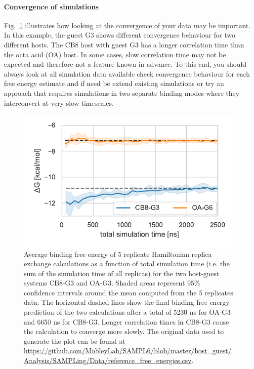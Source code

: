 \documentclass[9pt,bestpractices]{livecoms}
\begin{document}
\paragraph{Convergence of simulations}
Fig.~\ref{fig:freeenergytrajectories} illustrates how looking at the convergence of your data may be important. In this example, the guest G3 shows different convergence behaviour for two different hosts. The CB8 host with guest G3 has a longer correlation time than the octa acid (OA) host. In some cases, slow correlation time may not be expected and therefore not a feature known in advance. To this end, you should always look at all simulation data available check convergence behaviour for each free energy estimate and if need be extend existing simulations or try an approach that requires simulations in two separate binding modes where they interconvert at very slow timescales.   
\begin{figure}
    \includegraphics[width=0.90\linewidth]{figures/fig9_convergence/Figure.pdf}
    \caption{Average binding free energy of 5 replicate Hamiltonian replica exchange calculations as a function of total simulation time (i.e. the sum of the simulation time of all replicas) for the two host-guest systems CB8-G3 and OA-G3. Shaded areas represent 95\% confidence intervals around the mean computed from the 5 replicates data. The horizontal dashed lines show the final binding free energy prediction of the two calculations after a total of 5230 ns for OA-G3 and 6650 ns for CB8-G3. Longer correlation times in CB8-G3 cause the calculation to converge more slowly. The original data used to generate the plot can be found at \url{https://github.com/MobleyLab/SAMPL6/blob/master/host_guest/Analysis/SAMPLing/Data/reference_free_energies.csv}.
}
    \label{fig:freeenergytrajectories}
\end{figure}
%
\end{document}
